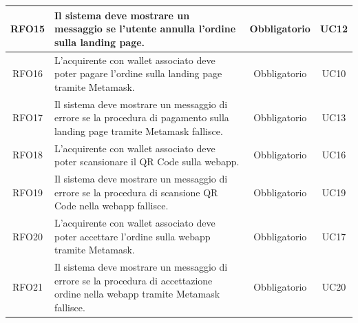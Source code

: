 \documentclass[a4paper, 12pt]{article}
\begin{document}
\begin{longtable}{|c|p{5cm}|c|c|}
RFO15 & Il sistema deve mostrare un messaggio se l'utente annulla l'ordine sulla landing page. & Obbligatorio & UC12 \\
\hline
RFO16 & L'acquirente con wallet associato deve poter pagare l'ordine sulla landing page tramite Metamask. & Obbligatorio & UC10 \\
\hline
RFO17 & Il sistema deve mostrare un messaggio di errore se la procedura di pagamento sulla landing page tramite Metamask fallisce. & Obbligatorio & UC13 \\
\hline
RFO18 & L'acquirente con wallet associato deve poter scansionare il QR Code sulla webapp. & Obbligatorio & UC16 \\
\hline
RFO19 & Il sistema deve mostrare un messaggio di errore se la procedura di scansione QR Code nella webapp fallisce. & Obbligatorio & UC19 \\
\hline
RFO20 & L'acquirente con wallet associato deve poter accettare l'ordine sulla webapp tramite Metamask. & Obbligatorio & UC17 \\
\hline
RFO21 & Il sistema deve mostrare un messaggio di errore se la procedura di accettazione ordine nella webapp tramite Metamask fallisce. & Obbligatorio & UC20 \\
\hline

\end{longtable}
\pagebreak
\end{document}
